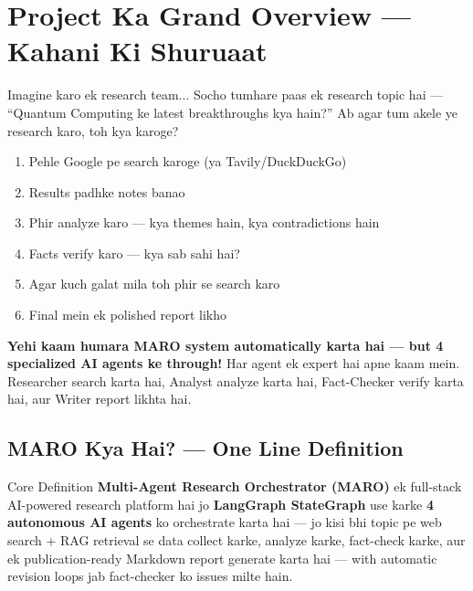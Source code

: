 \documentclass[11pt,a4paper,twoside]{report}
\begin{document}
\tableofcontents
\newpage



\chapter{Project Ka Grand Overview --- Kahani Ki Shuruaat}

\begin{storybox}{Imagine karo ek research team...}
Socho tumhare paas ek research topic hai --- ``Quantum Computing ke latest breakthroughs kya hain?'' Ab agar tum akele ye research karo, toh kya karoge?
\begin{enumerate}
    \item Pehle Google pe search karoge (ya Tavily/DuckDuckGo)
    \item Results padhke notes banao
    \item Phir analyze karo --- kya themes hain, kya contradictions hain
    \item Facts verify karo --- kya sab sahi hai?
    \item Agar kuch galat mila toh phir se search karo
    \item Final mein ek polished report likho
\end{enumerate}

\textbf{Yehi kaam humara MARO system automatically karta hai --- but 4 specialized AI agents ke through!} Har agent ek expert hai apne kaam mein. Researcher search karta hai, Analyst analyze karta hai, Fact-Checker verify karta hai, aur Writer report likhta hai.
\end{storybox}

\section{MARO Kya Hai? --- One Line Definition}

\begin{conceptbox}{Core Definition}
\textbf{Multi-Agent Research Orchestrator (MARO)} ek full-stack AI-powered research platform hai jo \textbf{LangGraph StateGraph} use karke \textbf{4 autonomous AI agents} ko orchestrate karta hai --- jo kisi bhi topic pe web search + RAG retrieval se data collect karke, analyze karke, fact-check karke, aur ek publication-ready Markdown report generate karta hai --- with automatic revision loops jab fact-checker ko issues milte hain.
\end{conceptbox}
\end{document}
